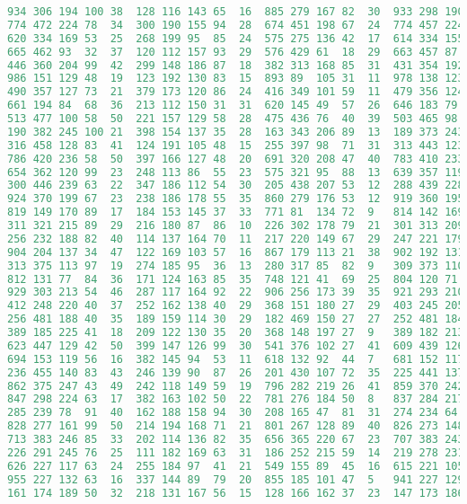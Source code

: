 \begin{lstlisting}[language=python]
934	306	194	100	38	128	116	143	65	16	885	279	167	82	30	933	298	190	95	28
774	472	224	78	34	300	190	155	94	28	674	451	198	67	24	774	457	224	76	31
620	334	169	53	25	268	199	95	85	24	575	275	136	42	17	614	334	155	39	16
665	462	93	32	37	120	112	157	93	29	576	429	61	18	29	663	457	87	20	33
446	360	204	99	42	299	148	186	87	18	382	313	168	85	31	431	354	192	96	30
986	151	129	48	19	123	192	130	83	15	893	89	105	31	11	978	138	123	35	11
490	357	127	73	21	379	173	120	86	24	416	349	101	59	11	479	356	124	58	6
661	194	84	68	36	213	112	150	31	31	620	145	49	57	26	646	183	79	61	36
513	477	100	58	50	221	157	129	58	28	475	436	76	40	39	503	465	98	54	40
190	382	245	100	21	398	154	137	35	28	163	343	206	89	13	189	373	243	97	17
316	458	128	83	41	124	191	105	48	15	255	397	98	71	31	313	443	123	83	41
786	420	236	58	50	397	166	127	48	20	691	320	208	47	40	783	410	233	43	35
654	362	120	99	23	248	113	86	55	23	575	321	95	88	13	639	357	119	90	17
300	446	239	63	22	347	186	112	54	30	205	438	207	53	12	288	439	228	53	12
924	370	199	67	23	238	186	178	55	35	860	279	176	53	12	919	360	195	55	13
819	149	170	89	17	184	153	145	37	33	771	81	134	72	9	814	142	169	88	12
311	321	215	89	29	216	180	87	86	10	226	302	178	79	21	301	313	209	79	16
256	232	188	82	40	114	137	164	70	11	217	220	149	67	29	247	221	179	77	30
904	204	137	34	47	122	169	103	57	16	867	179	113	21	38	902	192	131	24	35
313	375	113	97	19	274	185	95	36	13	280	317	85	82	9	309	373	110	91	19
812	131	77	84	36	171	124	163	85	35	748	121	41	69	25	804	120	71	70	23
929	303	213	54	46	287	117	164	92	22	906	256	173	39	35	921	293	210	54	34
412	248	220	40	37	252	162	138	40	29	368	151	180	27	29	403	245	205	35	32
256	481	188	40	35	189	159	114	30	29	182	469	150	27	27	252	481	184	39	33
389	185	225	41	18	209	122	130	35	20	368	148	197	27	9	389	182	213	36	3
623	447	129	42	50	399	147	126	99	30	541	376	102	27	41	609	439	126	30	40
694	153	119	56	16	382	145	94	53	11	618	132	92	44	7	681	152	117	50	2
236	455	140	83	43	246	139	90	87	26	201	430	107	72	35	225	441	137	83	33
862	375	247	43	49	242	118	149	59	19	796	282	219	26	41	859	370	242	28	41
847	298	224	63	17	382	163	102	50	22	781	276	184	50	8	837	284	217	58	10
285	239	78	91	40	162	188	158	94	30	208	165	47	81	31	274	234	64	83	26
828	277	161	99	50	214	194	168	71	21	801	267	128	89	40	826	273	148	93	40
713	383	246	85	33	202	114	136	82	35	656	365	220	67	23	707	383	243	83	32
226	291	245	76	25	111	182	169	63	31	186	252	215	59	14	219	278	231	71	12
626	227	117	63	24	255	184	97	41	21	549	155	89	45	16	615	221	105	63	16
955	227	132	63	16	337	144	89	79	20	855	185	101	47	5	941	227	129	63	10
161	174	189	50	32	218	131	167	56	15	128	166	162	37	23	147	173	186	36	20

\end{lstlisting}
